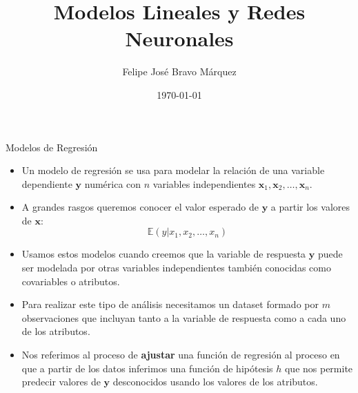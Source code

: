 \documentclass[handout]{beamer}
\title{Modelos Lineales y Redes Neuronales}
\author[Felipe Bravo Márquez]{\footnotesize
 \textcolor[rgb]{0.00,0.00,1.00}{Felipe José Bravo Márquez}}
\institute{Universidad de Chile- Minería de Datos}
\date{ \today }
\begin{document}
\begin{frame}
\titlepage


\end{frame}





\begin{frame}{Modelos de Regresión}
\scriptsize{
\begin{itemize}

 \item Un modelo de regresión se usa para modelar la relación de una variable dependiente $\mathbf{y}$ numérica con $n$ variables independientes $\mathbf{x}_1, \mathbf{x}_2, \dots, \mathbf{x}_n$. 
 
 \item A grandes rasgos queremos conocer el valor esperado de $\mathbf{y}$ a partir los valores de $\mathbf{x}$:
 \begin{displaymath}
 \mathbb{E}(y|x_1,x_2,\dots,x_n)
 \end{displaymath}

 
 \item Usamos estos modelos cuando creemos que la variable de respuesta $\mathbf{y}$ puede ser modelada por otras variables independientes también conocidas como covariables o atributos.
 
 \item Para realizar este tipo de análisis necesitamos un dataset formado por $m$ observaciones que incluyan tanto a la variable de respuesta como a cada uno de los atributos.
 
 \item Nos referimos al proceso de \textbf{ajustar} una función de regresión al proceso en que a partir de los datos inferimos una función de hipótesis $h$ que nos permite predecir valores de $\mathbf{y}$ desconocidos usando los valores de los atributos.

 
\end{itemize}



} 
 
\end{frame}
\end{document}
